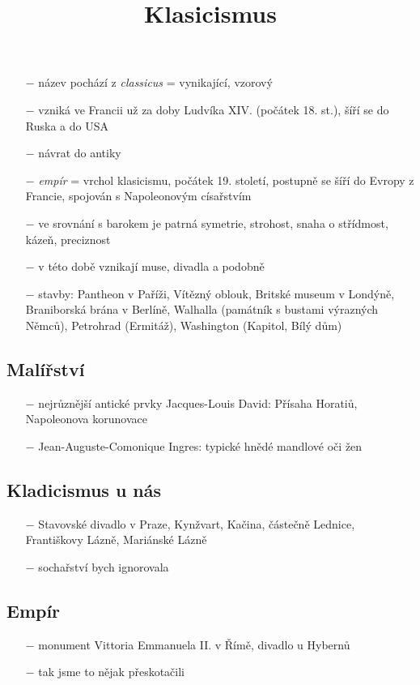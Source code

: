 \documentclass{article}
\title{\vspace{-2cm}Klasicismus\vspace{-1.7cm}}
\date{}
\author{}
\begin{document}
\maketitle

\begin{itemize}
    \vspace{-0.5em}
    \setlength\itemsep{0.15em}
    \item[$-$] název pochází z \textit{classicus} = vynikající, vzorový
    \item[$-$] vzniká ve Francii už za doby Ludvíka XIV. (počátek 18. st.), šíří se do Ruska a do USA
    \item[$-$] návrat do antiky
    \item[$-$] \textit{empír} = vrchol klasicismu, počátek 19. století, postupně se šíří do Evropy z Francie, spojován s Napoleonovým císařstvím
    \item[$-$] ve srovnání s barokem je patrná symetrie, strohost, snaha o střídmost, kázeň, preciznost
    \item[$-$] v této době vznikají muse, divadla a podobně
    \item[$-$] stavby: Pantheon v Paříži, Vítězný oblouk, Britské museum v Londýně, Braniborská brána v Berlíně, Walhalla (památník s bustami výrazných Němců), Petrohrad (Ermitáž), Washington (Kapitol, Bílý dům)
\end{itemize}

\subsection*{Malířství}
\begin{itemize}
    \vspace{-0.5em}
    \setlength\itemsep{0.15em}
    \item[$-$] nejrůznější antické prvky
    Jacques-Louis David: Přísaha Horatiů, Napoleonova korunovace
    \item[$-$] Jean-Auguste-Comonique Ingres: typické hnědé mandlové oči žen
\end{itemize}

\subsection*{Kladicismus u nás}
\begin{itemize}
    \vspace{-0.5em}
    \setlength\itemsep{0.15em}
    \item[$-$] Stavovské divadlo v Praze, Kynžvart, Kačina, částečně Lednice, Františkovy Lázně, Mariánské Lázně
    \item[$-$] sochařství bych ignorovala
\end{itemize}

\subsection*{Empír}
\begin{itemize}
    \vspace{-0.5em}
    \setlength\itemsep{0.15em}
    \item[$-$] monument Vittoria Emmanuela II. v Římě, divadlo u Hybernů
    \item[$-$] tak jsme to nějak přeskotačili
\end{itemize}
\end{document}
